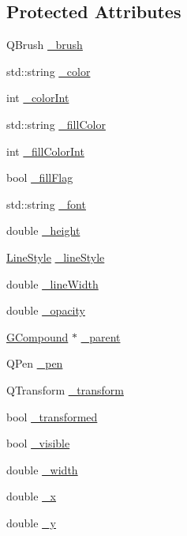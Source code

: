 \subsection*{Protected Attributes}
\begin{DoxyCompactItemize}
\item 
Q\+Brush \mbox{\hyperlink{classsgl_1_1GObject_aab24462ec896b596d99911767b0912d0}{\+\_\+brush}}
\item 
std\+::string \mbox{\hyperlink{classsgl_1_1GObject_a1134e770ae4315ea8bc1201e2f21da8b}{\+\_\+color}}
\item 
int \mbox{\hyperlink{classsgl_1_1GObject_a003fdd343d9b7505c53a8b7a134200ed}{\+\_\+color\+Int}}
\item 
std\+::string \mbox{\hyperlink{classsgl_1_1GObject_a179f8d6cee65cd8a54692e32b224392a}{\+\_\+fill\+Color}}
\item 
int \mbox{\hyperlink{classsgl_1_1GObject_a751def333a67d651e5b99cc331ecb496}{\+\_\+fill\+Color\+Int}}
\item 
bool \mbox{\hyperlink{classsgl_1_1GObject_ad4a55cbcd61b58a4d49666490bb2f103}{\+\_\+fill\+Flag}}
\item 
std\+::string \mbox{\hyperlink{classsgl_1_1GObject_aea76ea1a8b5dd7b0a78653277e63b536}{\+\_\+font}}
\item 
double \mbox{\hyperlink{classsgl_1_1GObject_ad05df29e7f27fc504abd743e3d8b4e73}{\+\_\+height}}
\item 
\mbox{\hyperlink{classsgl_1_1GObject_a86e0f5648542856159bb40775c854aa7}{Line\+Style}} \mbox{\hyperlink{classsgl_1_1GObject_a89bafecaafb7c72d55c7efc10b7d0523}{\+\_\+line\+Style}}
\item 
double \mbox{\hyperlink{classsgl_1_1GObject_a16e9033665937f13de2e163dc2184aff}{\+\_\+line\+Width}}
\item 
double \mbox{\hyperlink{classsgl_1_1GObject_a20eff8eb7af27182edc9bfc54768b6f3}{\+\_\+opacity}}
\item 
\mbox{\hyperlink{classsgl_1_1GCompound}{G\+Compound}} $\ast$ \mbox{\hyperlink{classsgl_1_1GObject_ac9452c1eaff70eebddbb318196aa3835}{\+\_\+parent}}
\item 
Q\+Pen \mbox{\hyperlink{classsgl_1_1GObject_afb69d172743f868299847174eb1b6bc8}{\+\_\+pen}}
\item 
Q\+Transform \mbox{\hyperlink{classsgl_1_1GObject_a475b8860a5f1adb4a1fdc58d1f5c1e32}{\+\_\+transform}}
\item 
bool \mbox{\hyperlink{classsgl_1_1GObject_ae4725802fc8d8aaa0ab4bd4781f7e07c}{\+\_\+transformed}}
\item 
bool \mbox{\hyperlink{classsgl_1_1GObject_a9312c72508471b7c7a87b540263e1af4}{\+\_\+visible}}
\item 
double \mbox{\hyperlink{classsgl_1_1GObject_ab55d85a3371770e6725b1062cf160cd8}{\+\_\+width}}
\item 
double \mbox{\hyperlink{classsgl_1_1GObject_a6675b83b27137b8d3aa2ad8133078ea6}{\+\_\+x}}
\item 
double \mbox{\hyperlink{classsgl_1_1GObject_a2f0f6aeafddc8a39c578bfa7e22b5f1e}{\+\_\+y}}
\end{DoxyCompactItemize}


